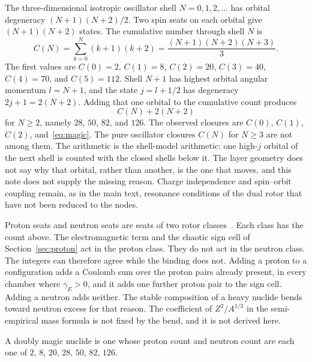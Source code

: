 \documentclass[a4paper]{article}
\begin{document}
The three-dimensional isotropic oscillator shell \(N=0,1,2,\dots\) has orbital degeneracy \((N+1)(N+2)/2\). Two spin seats on each orbital give \((N+1)(N+2)\) states. The cumulative number through shell \(N\) is
\begin{equation}
\label{eq:C}
C(N)
  =\sum_{k=0}^{N}(k+1)(k+2)
  =\frac{(N+1)(N+2)(N+3)}{3}.
\end{equation}
The first values are \(C(0)=2\), \(C(1)=8\), \(C(2)=20\), \(C(3)=40\), \(C(4)=70\), and \(C(5)=112\). Shell \(N+1\) has highest orbital angular momentum \(l=N+1\), and the state \(j=l+1/2\) has degeneracy \(2j+1=2(N+2)\). Adding that one orbital to the cumulative count produces
\begin{equation}
\label{eq:magic}
C(N)+2(N+2)
\end{equation}
for \(N\ge 2\), namely \(28\), \(50\), \(82\), and \(126\). The observed closures are \(C(0)\), \(C(1)\), \(C(2)\), and~\eqref{eq:magic}. The pure oscillator closures \(C(N)\) for \(N\ge 3\) are not among them. The arithmetic is the shell-model arithmetic: one high-\(j\) orbital of the next shell is counted with the closed shells below it. The layer geometry does not say why that orbital, rather than another, is the one that moves, and this note does not supply the missing reason. Charge independence and spin--orbit coupling remain, as in the main text, resonance conditions of the dual rotor that have not been reduced to the nodes.

Proton seats and neutron seats are seats of two rotor classes~\cite{dst-dio}. Each class has the count above. The electromagnetic term and the chaotic sign cell of Section~\ref{sec:proton} act in the proton class. They do not act in the neutron class. The integers can therefore agree while the binding does not. Adding a proton to a configuration adds a Coulomb sum over the proton pairs already present, in every chamber where \(\gamma_E>0\), and it adds one further proton pair to the sign cell. Adding a neutron adds neither. The stable composition of a heavy nuclide bends toward neutron excess for that reason. The coefficient of \(Z^{2}/A^{1/3}\) in the semi-empirical mass formula is not fixed by the bend, and it is not derived here.

A doubly magic nuclide is one whose proton count and neutron count are each one of \(2\), \(8\), \(20\), \(28\), \(50\), \(82\), \(126\).
\end{document}
